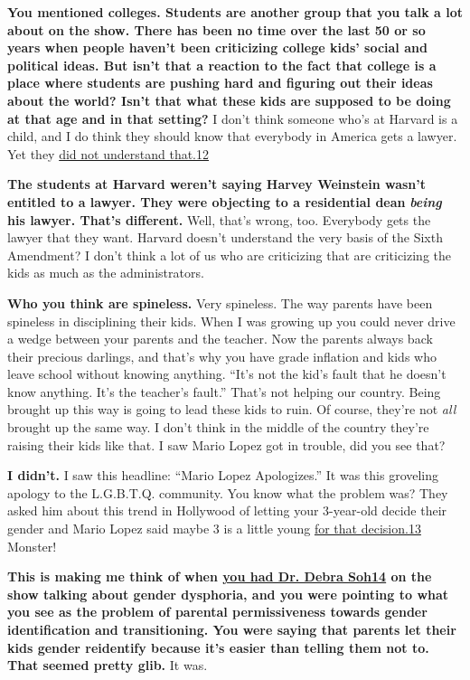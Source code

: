 \textbf{You mentioned colleges. Students are another group that you talk
a lot about on the show. There has been no time over the last 50 or so
years when people haven't been criticizing college kids' social and
political ideas. But isn't that a reaction to the fact that college is a
place where students are pushing hard and figuring out their ideas about
the world? Isn't that what these kids are supposed to be doing at that
age and in that setting?} I don't think someone who's at Harvard is a
child, and I do think they should know that everybody in America gets a
lawyer. Yet they \href{http://nytimes3xbfgragh.onion\#tooltip-12}{did
not understand that.12}

\textbf{The students at Harvard weren't saying Harvey Weinstein wasn't
entitled to a lawyer. They were objecting to a residential dean}
\emph{\textbf{being}} \textbf{his lawyer. That's different.} Well,
that's wrong, too. Everybody gets the lawyer that they want. Harvard
doesn't understand the very basis of the Sixth Amendment? I don't think
a lot of us who are criticizing that are criticizing the kids as much as
the administrators.

\textbf{Who you think are spineless.} Very spineless. The way parents
have been spineless in disciplining their kids. When I was growing up
you could never drive a wedge between your parents and the teacher. Now
the parents always back their precious darlings, and that's why you have
grade inflation and kids who leave school without knowing anything.
``It's not the kid's fault that he doesn't know anything. It's the
teacher's fault.'' That's not helping our country. Being brought up this
way is going to lead these kids to ruin. Of course, they're not
\emph{all} brought up the same way. I don't think in the middle of the
country they're raising their kids like that. I saw Mario Lopez got in
trouble, did you see that?

\textbf{I didn't.} I saw this headline: ``Mario Lopez Apologizes.'' It
was this groveling apology to the L.G.B.T.Q. community. You know what
the problem was? They asked him about this trend in Hollywood of letting
your 3-year-old decide their gender and Mario Lopez said maybe 3 is a
little young \href{http://nytimes3xbfgragh.onion\#tooltip-13}{for that
decision.13} Monster!

\textbf{This is making me think of when
\href{http://nytimes3xbfgragh.onion\#tooltip-14}{you had Dr. Debra
Soh14} on the show talking about gender dysphoria, and you were pointing
to what you see as the problem of parental permissiveness towards gender
identification and transitioning. You were saying that parents let their
kids gender reidentify because it's easier than telling them not to.
That seemed pretty glib.} It was.


